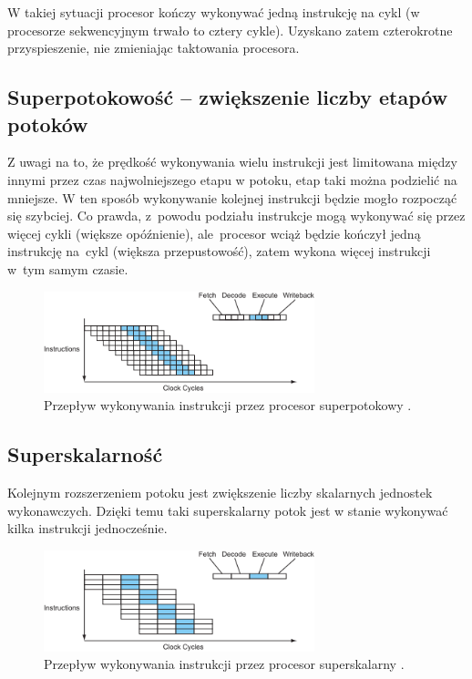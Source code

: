 W takiej sytuacji procesor kończy wykonywać jedną instrukcję na cykl (w procesorze sekwencyjnym trwało to cztery cykle). Uzyskano zatem czterokrotne przyspieszenie, nie zmieniając taktowania procesora.

\subsection{Superpotokowość -- zwiększenie liczby etapów potoków}

Z uwagi na to, że prędkość wykonywania wielu instrukcji jest limitowana między innymi przez czas najwolniejszego etapu w potoku, etap taki można podzielić na mniejsze. W ten sposób wykonywanie kolejnej instrukcji będzie mogło rozpocząć się szybciej. 
Co prawda, z~powodu podziału instrukcje mogą wykonywać się przez więcej cykli (większe opóźnienie), ale~procesor wciąż będzie kończył jedną instrukcję na~cykl (większa przepustowość), zatem wykona więcej instrukcji w~tym samym czasie.

\begin{figure}[!h]
	\centering
	\includegraphics[width=0.7\textwidth]{images/superpipelined2}
	\caption{Przepływ wykonywania instrukcji przez procesor superpotokowy \cite{ModernMicroprocessors90MinGuide}.}
\end{figure}

\subsection{Superskalarność}

Kolejnym rozszerzeniem potoku jest zwiększenie liczby skalarnych jednostek wykonawczych. Dzięki temu taki superskalarny potok jest w stanie wykonywać kilka instrukcji jednocześnie.

\begin{figure}[!h]
	\centering
	\includegraphics[width=0.7\textwidth]{images/superscalar2}
	\caption{Przepływ wykonywania instrukcji przez procesor superskalarny \cite{ModernMicroprocessors90MinGuide}.}
\end{figure}


